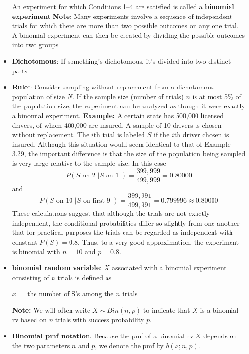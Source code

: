 \documentclass{report}
\begin{document}
\begin{itemize}
\begin{enumerate}
        \end{enumerate}
        \bigbreak \noindent 
        An experiment for which Conditions 1–4 are satisfied is called a \textbf{binomial experiment}
        \bigbreak \noindent 
        \textbf{Note:} Many experiments involve a sequence of independent trials for which there are more than two possible outcomes on any one trial. A binomial experiment can then be created by dividing the possible outcomes into two groups
    \item \textbf{Dichotomous}: If something's dichotomous, it's divided into two distinct parts
    \item \textbf{Rule:}: Consider sampling without replacement from a dichotomous population of
        size $N$. If the sample size (number of trials) $n$ is at most 5\% of the population
        size, the experiment can be analyzed as though it were exactly a binomial
        experiment.
        \bigbreak \noindent 
        \textbf{Example:} A certain state has 500,000 licensed drivers, of whom 400,000 are insured. A sample of 10 drivers is chosen without replacement. The $i$th trial is labeled $S$ if the $i$th driver chosen is insured. Although this situation would seem identical to that of Example 3.29, the important difference is that the size of the population being sampled is very large relative to the sample size. In this case
        \[
            P(S \text{ on 2 } | S \text{ on 1 }) = \frac{399,999}{499,999} = 0.80000
        \]
        and
        \[
            P(S \text{ on 10 } | S \text{ on first 9 }) = \frac{399,991}{499,991} = 0.799996 \approx 0.80000
        \]
        These calculations suggest that although the trials are not exactly independent, the conditional probabilities differ so slightly from one another that for practical purposes the trials can be regarded as independent with constant $P(S) = 0.8$. Thus, to a very good approximation, the experiment is binomial with $n = 10$ and $p = 0.8$.
    \item \textbf{binomial random variable}: $X$ associated with a binomial experiment consisting of $n$ trials is defined as
        \begin{center}
            $x=$ the number of S’s among the $n$ trials
        \end{center}
        \bigbreak \noindent 
        \textbf{Note:} We will often write $X \sim Bin(n,p)$ to indicate that $X$ is a binomial rv based on $n$ trials with success probability $p$.
    \item \textbf{Binomial pmf notation}: Because the pmf of a binomial rv $X$ depends on the two parameters $n$ and $p$, we denote the pmf by $b(x; n, p)$.

\end{itemize}
\end{document}
